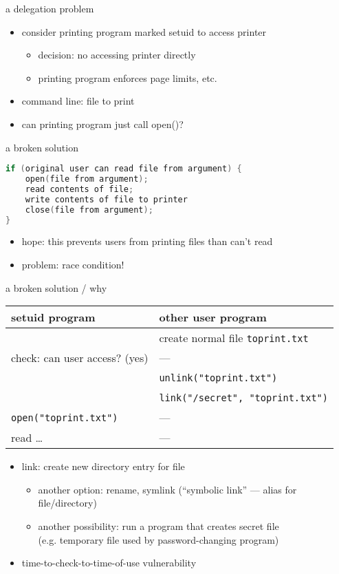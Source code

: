 \begin{frame}{a delegation problem}
\begin{itemize}
\item consider printing program marked setuid to access printer
    \begin{itemize}
    \item decision: no accessing printer directly
    \item printing program enforces page limits, etc.
    \end{itemize}
\item command line: file to print
\item can printing program just call open()?
\end{itemize}
\end{frame}

\begin{frame}[fragile,label=delegationBroken]{a broken solution}
\begin{lstlisting}[language=C++,style=small]
if (original user can read file from argument) {
    open(file from argument);
    read contents of file;
    write contents of file to printer
    close(file from argument);
}
\end{lstlisting}
\begin{itemize}
\item hope: this prevents users from printing files than can't read
\item problem: race condition!
\end{itemize}
\end{frame}

\begin{frame}[fragile,label=delegationBrokenWhy]{a broken solution / why}
\begin{tabular}{l|l}
setuid program & other user program \\ \hline
                & create normal file \texttt{toprint.txt} \\
check: can user access? (yes)  & --- \\
~ & \texttt{unlink("toprint.txt")} \\
~ & \texttt{link("/secret", "toprint.txt")} \\
\texttt{open("toprint.txt")} & --- \\
read \ldots & --- \\
\end{tabular}
\begin{itemize}
\item link: create new directory entry for file
    \begin{itemize}
    \item another option: rename, symlink (``symbolic link'' --- alias for file/directory)
    \item another possibility: run a program that creates secret file \\
        (e.g. temporary file used by password-changing program)
    \end{itemize}
\item time-to-check-to-time-of-use vulnerability
\end{itemize}
\end{frame}

